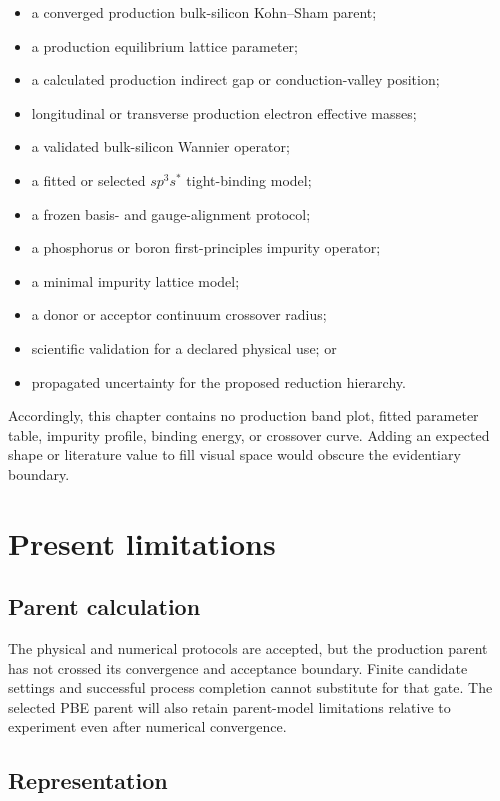 \begin{itemize}
  \item a converged production bulk-silicon Kohn--Sham parent;
  \item a production equilibrium lattice parameter;
  \item a calculated production indirect gap or conduction-valley position;
  \item longitudinal or transverse production electron effective masses;
  \item a validated bulk-silicon Wannier operator;
  \item a fitted or selected $sp^3s^{\ast}$ tight-binding model;
  \item a frozen basis- and gauge-alignment protocol;
  \item a phosphorus or boron first-principles impurity operator;
  \item a minimal impurity lattice model;
  \item a donor or acceptor continuum crossover radius;
  \item scientific validation for a declared physical use; or
  \item propagated uncertainty for the proposed reduction hierarchy.
\end{itemize}

Accordingly, this chapter contains no production band plot, fitted parameter
table, impurity profile, binding energy, or crossover curve. Adding an expected
shape or literature value to fill visual space would obscure the evidentiary
boundary.

\section{Present limitations}

\subsection{Parent calculation}

The physical and numerical protocols are accepted, but the production parent
has not crossed its convergence and acceptance boundary. Finite candidate
settings and successful process completion cannot substitute for that gate.
The selected PBE parent will also retain parent-model limitations relative to
experiment even after numerical convergence.

\subsection{Representation}

